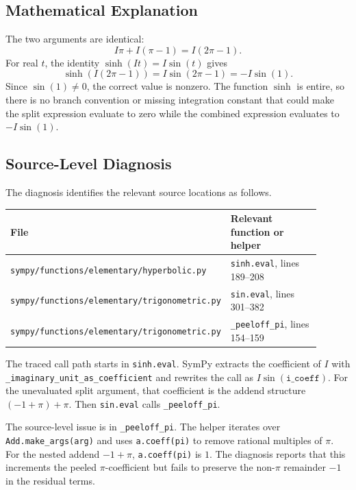 \documentclass[11pt]{article}
\begin{document}
\subsection{Mathematical Explanation}

The two arguments are identical:
\[
  I\pi + I(\pi - 1) = I(2\pi - 1).
\]
For real \(t\), the identity \(\sinh(It)=I\sin(t)\) gives
\[
  \sinh(I(2\pi - 1)) = I\sin(2\pi - 1) = -I\sin(1).
\]
Since \(\sin(1) \ne 0\), the correct value is nonzero. The function
\(\sinh\) is entire, so there is no branch convention or missing integration
constant that could make the split expression evaluate to zero while the
combined expression evaluates to \(-I\sin(1)\).

\subsection{Source-Level Diagnosis}

The diagnosis identifies the relevant source locations as follows.
\begin{center}
\renewcommand{\arraystretch}{1.15}
\begin{tabular}{@{}>{\raggedright\arraybackslash}p{0.58\linewidth}>{\raggedright\arraybackslash}p{0.32\linewidth}@{}}
\toprule
\textbf{File} & \textbf{Relevant function or helper} \\
\midrule
\nolinkurl{sympy/functions/elementary/hyperbolic.py} & \texttt{sinh.eval}, lines 189--208 \\
\nolinkurl{sympy/functions/elementary/trigonometric.py} & \texttt{sin.eval}, lines 301--382 \\
\nolinkurl{sympy/functions/elementary/trigonometric.py} & \texttt{\_peeloff\_pi}, lines 154--159 \\
\bottomrule
\end{tabular}
\end{center}

The traced call path starts in \texttt{sinh.eval}. SymPy extracts the
coefficient of \(I\) with \nolinkurl{_imaginary_unit_as_coefficient} and
rewrites the call as \(I\sin(\texttt{i\_coeff})\). For the unevaluated split
argument, that coefficient is the addend structure \(({-1}+\pi)+\pi\). Then
\texttt{sin.eval} calls \texttt{\_peeloff\_pi}.

The source-level issue is in \texttt{\_peeloff\_pi}. The helper iterates over
\texttt{Add.make\_args(arg)} and uses \texttt{a.coeff(pi)} to remove rational
multiples of \(\pi\). For the nested addend \(-1+\pi\),
\texttt{a.coeff(pi)} is \(1\). The diagnosis reports that this increments the
peeled \(\pi\)-coefficient but fails to preserve the non-\(\pi\) remainder
\(-1\) in the residual terms.
\end{document}
